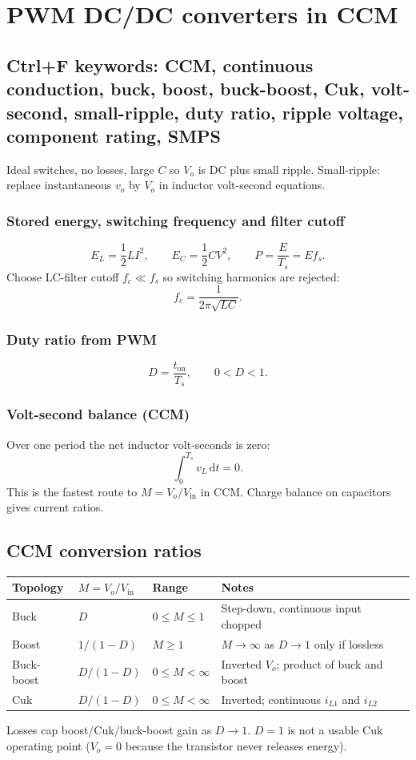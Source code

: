 \section{PWM DC/DC converters in CCM}

\subsection{Ctrl+F keywords: CCM, continuous conduction, buck, boost, buck-boost, Cuk, volt-second, small-ripple, duty ratio, ripple voltage, component rating, SMPS}

Ideal switches, no losses, large \(C\) so \(V_o\) is DC plus small ripple. Small-ripple: replace instantaneous \(v_o\) by \(V_o\) in inductor volt-second equations.

\subsubsection{Stored energy, switching frequency and filter cutoff}
\[
E_L=\frac12 L I^2,\qquad E_C=\frac12 C V^2,\qquad P=\frac{E}{T_s}=E f_s.
\]
Choose LC-filter cutoff \(f_c\ll f_s\) so switching harmonics are rejected:
\[
f_c=\frac{1}{2\pi\sqrt{LC}}.
\]

\subsubsection{Duty ratio from PWM}
\[
D=\frac{t_{\mathrm{on}}}{T_s},\qquad 0<D<1.
\]

\subsubsection{Volt-second balance (CCM)}
Over one period the net inductor volt-seconds is zero:
\[
\int_0^{T_s} v_L\,\mathrm{d}t=0.
\]
This is the fastest route to \(M=V_o/V_{\mathrm{in}}\) in CCM. Charge balance on capacitors gives current ratios.

\subsection{CCM conversion ratios}
\begin{center}
\begin{tabular}{@{}l l l l@{}}
\toprule
Topology & \(M=V_o/V_{\mathrm{in}}\) & Range & Notes\\
\midrule
Buck & \(D\) & \(0\le M\le 1\) & Step-down, continuous input chopped\\
Boost & \(1/(1-D)\) & \(M\ge 1\) & \(M\to\infty\) as \(D\to 1\) only if lossless\\
Buck-boost & \(D/(1-D)\) & \(0\le M<\infty\) & Inverted \(V_o\); product of buck and boost\\
Cuk & \(D/(1-D)\) & \(0\le M<\infty\) & Inverted; continuous \(i_{L1}\) and \(i_{L2}\)\\
\bottomrule
\end{tabular}
\end{center}
Losses cap boost/Cuk/buck-boost gain as \(D\to 1\). \(D=1\) is not a usable Cuk operating point (\(V_o=0\) because the transistor never releases energy).

